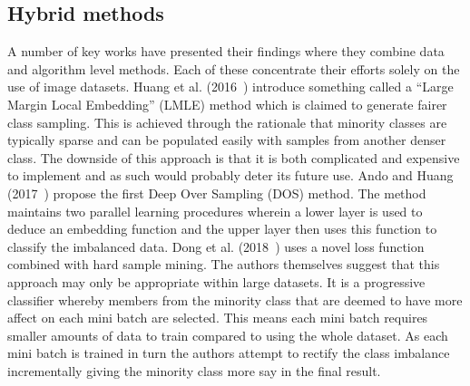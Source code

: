 \subsection{Hybrid methods}\label{subsec:DeepLearningHybridMethods}
A number of key works have presented their findings where they combine data and algorithm level methods. Each of these concentrate their efforts solely on the use of image datasets. Huang et al. (2016~\cite{huang2016learning}) introduce something called a ``Large Margin Local Embedding'' (LMLE) method which is claimed to generate fairer class sampling. This is achieved through the rationale that minority classes are typically sparse and can be populated easily with samples from another denser class. The downside of this approach is that it is both complicated and expensive to implement and as such would probably deter its future use. Ando and Huang (2017~\cite{ando2017deep}) propose the first Deep Over Sampling (DOS) method. The method maintains two parallel learning procedures wherein a lower layer is used to deduce an embedding function and the upper layer then uses this function to classify the imbalanced data. Dong et al. (2018~\cite{dong2018imbalanced}) uses a novel loss function combined with hard sample mining. The authors themselves suggest that this approach may only be appropriate within large datasets. It is a progressive classifier whereby members from the minority class that are deemed to have more affect on each mini batch are selected. This means each mini batch requires smaller amounts of data to train compared to using the whole dataset. As each mini batch is trained in turn the authors attempt to rectify the class imbalance incrementally giving the minority class more say in the final result.

